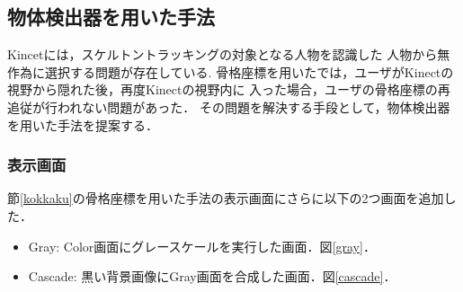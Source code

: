 \clearpage
\subsection{物体検出器を用いた手法}
Kincetには，スケルトントラッキングの対象となる人物を認識した
人物から無作為に選択する問題が存在している\cite{hitogomi}.
骨格座標を用いたでは，ユーザがKinectの視野から隠れた後，再度Kinectの視野内に
入った場合，ユーザの骨格座標の再追従が行われない問題があった．
その問題を解決する手段として，物体検出器を用いた手法を提案する．

\subsubsection{表示画面}
節\ref{kokkaku}の骨格座標を用いた手法の表示画面にさらに以下の2つ画面を追加した．

\begin{itemize}
    \item Gray: Color画面にグレースケールを実行した画面．図\ref{gray}．
    \item Cascade: 黒い背景画像にGray画面を合成した画面．図\ref{cascade}．
\end{itemize}

\vspace{1cm}


